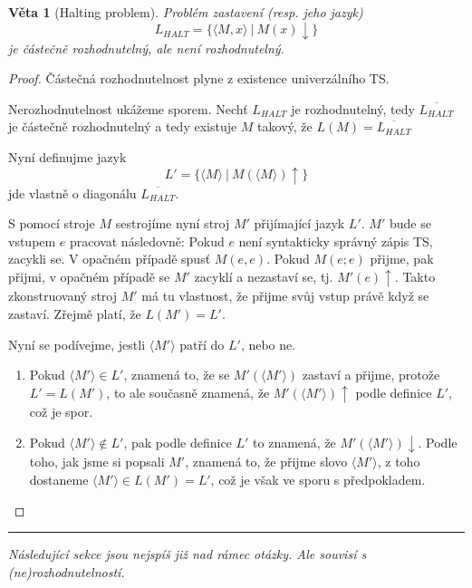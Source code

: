\documentclass[11pt]{report} %
\newtheorem{theorem}{Věta}[section]
\numberwithin{equation}{section}
\begin{document}
\begin{theorem}[Halting problem]
Problém zastavení (resp. jeho jazyk)
$$L_{HALT} = \{\langle M, x\rangle\ |\ M(x){\downarrow} \}$$
je částečně rozhodnutelný, ale není rozhodnutelný.
\end{theorem}
\begin{proof}
Částečná rozhodnutelnost plyne z existence univerzálního TS. 

Nerozhodnutelnost ukážeme sporem. Nechť $L_{HALT}$ je rozhodnutelný, tedy $\overline{L_{HALT}}$ je částečně rozhodnutelný a tedy existuje $M$ takový, že $L(M) = \overline{L_{HALT}}$

Nyní definujme jazyk 
$$L' = \{\langle M\rangle\ |\ M(\langle M\rangle){\uparrow}\}$$ 
jde vlastně o diagonálu $\overline{L_{HALT}}$.
 
S pomocí stroje $M$ sestrojíme nyní stroj $M'$ přijímající jazyk $L'$. $M'$ bude se vstupem $e$ pracovat následovně: Pokud $e$ není syntakticky správný zápis TS, zacykli se. V opačném případě spusť $M(e, e)$. Pokud $M(e; e)$ přijme, pak přijmi, v opačném případě se $M'$ zacyklí a nezastaví se, tj. $M'(e){\uparrow}$. Takto zkonstruovaný stroj $M'$ má tu vlastnost, že přijme svůj vstup právě když se zastaví. Zřejmě platí, že $L(M') = L'$. 

Nyní se podívejme, jestli $\langle M' \rangle$ patří do $L'$, nebo ne.
\begin{enumerate}
	
	
	\item Pokud $\langle M' \rangle \in L'$, znamená to, že se $M'(\langle M' \rangle)$ zastaví a přijme, protože $L' = L(M')$, to ale současně znamená, že $M'(\langle M' \rangle){\uparrow}$ podle definice $L'$, což je spor.
	
	\item Pokud $\langle M' \rangle \notin L'$, pak podle definice $L'$ to znamená, že $M'(\langle M' \rangle){\downarrow}$. Podle toho, jak jsme si popsali $M'$, znamená to, že přijme slovo $\langle M' \rangle$, z toho dostaneme $\langle M' \rangle \in L(M') = L'$, což je však ve sporu s předpokladem.
\end{enumerate}
\end{proof}

\hrule
\medskip
\textit{Následující sekce jsou nejspíš již nad rámec otázky. Ale souvisí s (ne)rozhodnutelností.}
\end{document}
